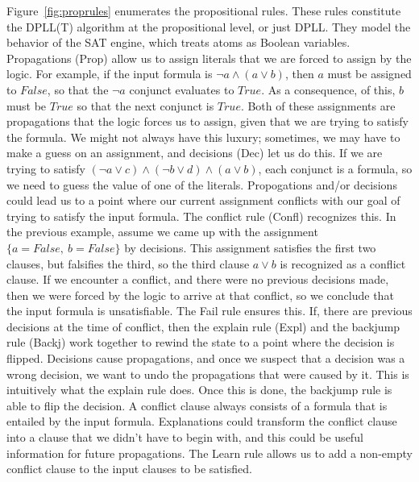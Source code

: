 \documentclass{article}
\begin{document}
Figure~\ref{fig:proprules} enumerates the propositional rules.
These rules constitute the DPLL(T) algorithm at the
propositional level, or just DPLL.
They model the behavior of the SAT engine, 
which treats atoms
as Boolean variables. Propagations (Prop) allow us to assign 
literals that we are forced to assign by the logic. 
For example, if the input formula is $\neg a \land (a \lor b)$, 
then $a$ must be assigned to $False$, so that the $\neg a$ 
conjunct evaluates to $True$. As a consequence, of this, 
$b$ must be $True$ so that the next conjunct is $True$. Both 
of these assignments are propagations that the logic forces 
us to assign, given that we are trying to satisfy the formula.
We might not always have this luxury; sometimes, we may have 
to make a guess on an assignment, and decisions (Dec) let us do 
this. If we are trying to satisfy 
$(\neg a \lor c) \land (\neg b \lor d) \land (a \lor b)$,
each conjunct is a 
formula, so we need to guess the value of one of the literals. 
Propogations and/or decisions could lead us to 
a point where our current assignment conflicts with 
our goal of trying to satisfy the input formula. The 
conflict rule (Confl) recognizes this. In the previous 
example, assume we came up with the assignment 
$\{a = False,\ b = False\}$ by decisions. This assignment 
satisfies the first two clauses, but falsifies the third, 
so the third clause 
$a \lor b$ is recognized as a conflict clause.
If we encounter a conflict, 
and there were no previous decisions made, then we were 
forced by the logic to arrive at that conflict, so we 
conclude that the input formula is unsatisfiable. The Fail 
rule ensures this. If, there are previous decisions at
the time of conflict, then the explain rule (Expl) 
and the backjump rule (Backj) work together to rewind 
the state to a point where the decision is flipped. 
Decisions cause propagations, and once we suspect that 
a decision was a wrong decision, we want to undo the 
propagations that were caused by it. This is intuitively 
what the explain rule does. Once this is done, the backjump rule is able to flip the decision. A conflict clause always 
consists of a formula that is entailed by the input formula. 
Explanations could transform the conflict 
clause into a clause that we didn't have to begin with, 
and this could be useful information for future propagations. 
The Learn rule allows us 
to add a non-empty conflict clause to the input clauses to be 
satisfied. 
\end{document}
